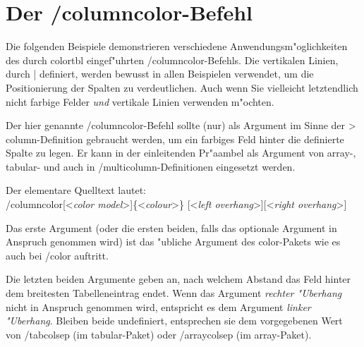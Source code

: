 \documentclass[ngerman]{article}
\begin{document}
\section{ Der \slash \textsf{columncolor}-Befehl}

Die folgenden Beispiele demonstrieren verschiedene Anwendungsm"oglichkeiten des durch 
\textsf{colortbl} eingef"uhrten \slash \textsf{columncolor}-Befehls. Die vertikalen Linien,
durch | 
definiert, werden bewusst in allen Beispielen verwendet, um die Positionierung der Spalten 
zu verdeutlichen. Auch wenn Sie vielleicht  letztendlich nicht farbige
Felder \emph{und} vertikale Linien verwenden m"ochten.

Der hier genannte \slash \textsf{columncolor}-Befehl sollte (nur) als Argument im Sinne 
der > 
column-Definition gebraucht werden, um ein farbiges Feld hinter die definierte Spalte zu 
legen. Er kann in der einleitenden Pr"aambel als Argument von \textsf{array}-, 
\textsf{tabular}- und auch in \slash{multicolumn}-Definitionen eingesetzt werden.

Der elementare Quelltext lautet:\\
\slash \textsf{columncolor}[<\emph{color model}>]\{<\emph{colour}>\}
                          [<\emph{left overhang}>][<\emph{right overhang}>]

Das erste Argument (oder die ersten beiden, falls das optionale Argument in Anspruch 
genommen wird) ist das "ubliche Argument des \textsf{color}-Pakets wie es
auch bei \slash \textsf{color} auftritt. 

Die letzten beiden Argumente geben an, nach welchem Abstand das Feld hinter dem breitesten
Tabelleneintrag endet.
Wenn das Argument \emph{rechter "Uberhang} nicht in Anspruch genommen wird, entspricht es 
dem Argument \emph{linker "Uberhang}. Bleiben beide undefiniert, entsprechen sie dem vorgegebenen 
Wert von \slash \textsf{tabcolsep} (im \textsf{tabular}-Paket) oder
\slash \textsf{arraycolsep} (im \textsf{array}-Paket).
\end{document}
